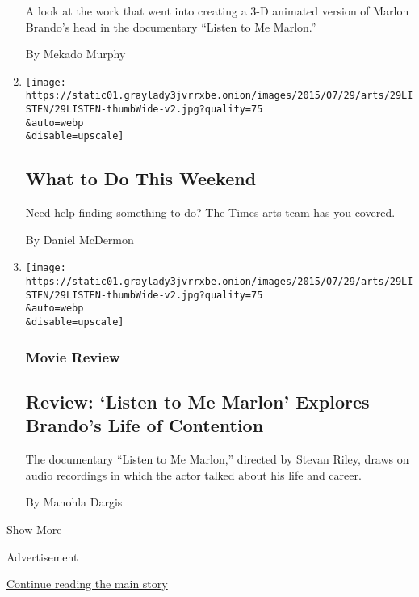\begin{enumerate}
  A look at the work that went into creating a 3-D animated version of
  Marlon Brando's head in the documentary ``Listen to Me Marlon.''

  By Mekado Murphy
\item
  \href{/2015/07/30/arts/what-to-do-this-weekend.html}{}

  \texttt{[image: https://static01.graylady3jvrrxbe.onion/images/2015/07/29/arts/29LISTEN/29LISTEN-thumbWide-v2.jpg?quality=75\\\&auto=webp\\\&disable=upscale]}

  \hypertarget{what-to-do-this-weekend}{%
  \subsection{What to Do This Weekend}\label{what-to-do-this-weekend}}

  Need help finding something to do? The Times arts team has you
  covered.

  By Daniel McDermon
\item
  \href{/2015/07/29/movies/review-listen-to-me-marlon-explores-brandos-life-of-contention.html}{}

  \texttt{[image: https://static01.graylady3jvrrxbe.onion/images/2015/07/29/arts/29LISTEN/29LISTEN-thumbWide-v2.jpg?quality=75\\\&auto=webp\\\&disable=upscale]}

  \hypertarget{movie-review}{%
  \subsubsection{Movie Review}\label{movie-review}}

  \hypertarget{review-listen-to-me-marlon-explores-brandos-life-of-contention}{%
  \subsection{Review: `Listen to Me Marlon' Explores Brando's Life of
  Contention}\label{review-listen-to-me-marlon-explores-brandos-life-of-contention}}

  The documentary ``Listen to Me Marlon,'' directed by Stevan Riley,
  draws on audio recordings in which the actor talked about his life and
  career.

  By Manohla Dargis
\end{enumerate}

Show More

Advertisement

\protect\hyperlink{after-mid1}{Continue reading the main story}

